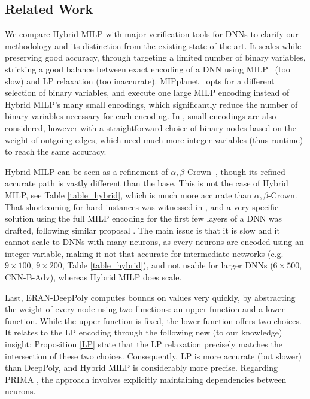 \subsection{Related Work} 

We compare Hybrid MILP with major verification tools for DNNs to clarify our methodology and its distinction from the existing state-of-the-art. It scales while preserving good accuracy, through targeting a limited number of binary variables, stricking a good balance between exact encoding of a DNN using MILP~\cite{MILP} (too slow) and LP relaxation (too inaccurate). MIPplanet~\cite{MIPplanet} opts for a different selection of binary variables, and execute one large MILP encoding instead of Hybrid MILP's many small encodings, which significantly reduce the number of binary variables necessary for each encoding. In \cite{DivideAndSlide}, small encodings are also considered, however with a straightforward choice of binary nodes based on the weight of outgoing edges, which need much more integer variables (thus runtime) to reach the same accuracy.

Hybrid MILP can be seen as a refinement of $\alpha,\beta$-Crown~\cite{crown}, though its refined accurate path is vastly different than the base. This is not the case of Hybrid MILP, see Table \ref{table_hybrid}, which is much more accurate than $\alpha,\beta$-Crown.
That shortcoming for hard instances was witnessed in \cite{crown}, and a very specific solution using the full MILP encoding for the first few layers of a DNN was drafted, following similar proposal \cite{MILP2}. The main issue is that it is slow
and it cannot scale to DNNs with many neurons, as every neurons are encoded using an integer variable, making it not that accurate for intermediate networks (e.g. $9\times100$, $9\times200$, Table \ref{table_hybrid}), and not usable for larger DNNs ($6\times500$, CNN-B-Adv), whereas Hybrid MILP does scale.


Last, ERAN-DeepPoly \cite{deeppoly} computes bounds on values very quickly, by abstracting the weight of every node using two functions: an upper function and a lower function. While the upper function is fixed, the lower function offers two choices.
It relates to the LP encoding through the following new (to our knowledge) insight:  Proposition \ref{LP} state that the LP relaxation precisely matches the intersection of these two choices. Consequently, LP is more accurate (but slower) than DeepPoly, and Hybrid MILP is considerably more precise. Regarding PRIMA \cite{prima}, the approach involves explicitly maintaining dependencies between neurons.


